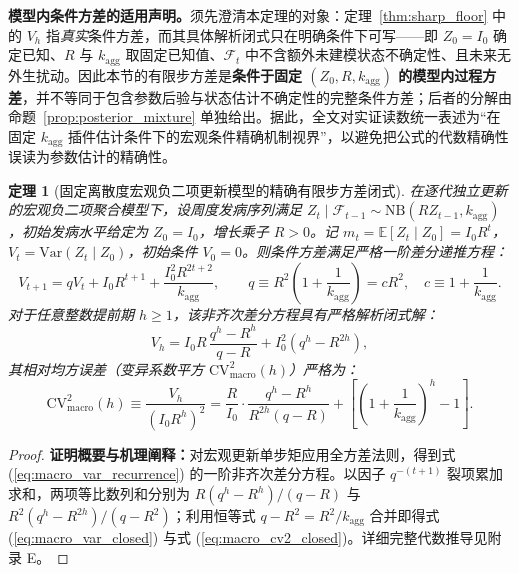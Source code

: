 \documentclass[10pt,a4paper]{article}
\theoremstyle{plain}
\newtheorem{theorem}{定理}
\theoremstyle{definition}
\begin{document}
\label{sec:macro_model}

\noindent\textbf{模型内条件方差的适用声明。}须先澄清本定理的对象：定理~\ref{thm:sharp_floor} 中的 $V_h$ 指\emph{真实}条件方差，而其具体解析闭式只在明确条件下可写——即 $Z_0=I_0$ 确定已知、$R$ 与 $k_{\text{agg}}$ 取固定已知值、$\mathcal{F}_t$ 中不含额外未建模状态不确定性、且未来无外生扰动。因此本节的有限步方差是\textbf{条件于固定 $(Z_0,R,k_{\text{agg}})$ 的模型内过程方差}，并不等同于包含参数后验与状态估计不确定性的完整条件方差；后者的分解由命题~\ref{prop:posterior_mixture} 单独给出。据此，全文对实证读数统一表述为“在固定 $k_{\text{agg}}$ 插件估计条件下的宏观条件精确机制视界”，以避免把公式的代数精确性误读为参数估计的精确性。

\begin{theorem}[固定离散度宏观负二项更新模型的精确有限步方差闭式]\label{thm:macro_exact}
在逐代独立更新的宏观负二项聚合模型下，设周度发病序列满足 $Z_t \mid \mathcal{F}_{t-1} \sim \text{NB}(R Z_{t-1}, k_{\text{agg}})$，初始发病水平给定为 $Z_0 = I_0$，增长乘子 $R > 0$。记 $m_t = \mathbb{E}[Z_t \mid Z_0] = I_0 R^t$，$V_t = \text{Var}(Z_t \mid Z_0)$，初始条件 $V_0 = 0$。则条件方差满足严格一阶差分递推方程：
\begin{equation}
V_{t+1} = q V_t + I_0 R^{t+1} + \frac{I_0^2 R^{2t+2}}{k_{\text{agg}}}, \qquad q \equiv R^2 \left(1 + \frac{1}{k_{\text{agg}}}\right) = c R^2, \quad c \equiv 1 + \frac{1}{k_{\text{agg}}}. \label{eq:macro_var_recurrence}
\end{equation}
对于任意整数提前期 $h \ge 1$，该非齐次差分方程具有严格解析闭式解：
\begin{equation}
V_h = I_0 R\, \frac{q^h - R^h}{q - R} + I_0^2 \left(q^h - R^{2h}\right), \label{eq:macro_var_closed}
\end{equation}
其相对均方误差（变异系数平方 $\text{CV}^2_{\text{macro}}(h)$）严格为：
\begin{equation}
\text{CV}^2_{\text{macro}}(h) \equiv \frac{V_h}{(I_0 R^h)^2} = \frac{R}{I_0}\cdot\frac{q^h - R^h}{R^{2h}(q - R)} + \left[\left(1 + \frac{1}{k_{\text{agg}}}\right)^{\!h} - 1\right]. \label{eq:macro_cv2_closed}
\end{equation}
\end{theorem}

\begin{proof}
\textbf{证明概要与机理阐释：}对宏观更新单步矩应用全方差法则，得到式 (\ref{eq:macro_var_recurrence}) 的一阶非齐次差分方程。以因子 $q^{-(t+1)}$ 裂项累加求和，两项等比数列和分别为 $R(q^h-R^h)/(q-R)$ 与 $R^2(q^h-R^{2h})/(q-R^2)$；利用恒等式 $q - R^2 = R^2/k_{\text{agg}}$ 合并即得式 (\ref{eq:macro_var_closed}) 与式 (\ref{eq:macro_cv2_closed})。详细完整代数推导见附录 E。
\end{proof}
\end{document}
